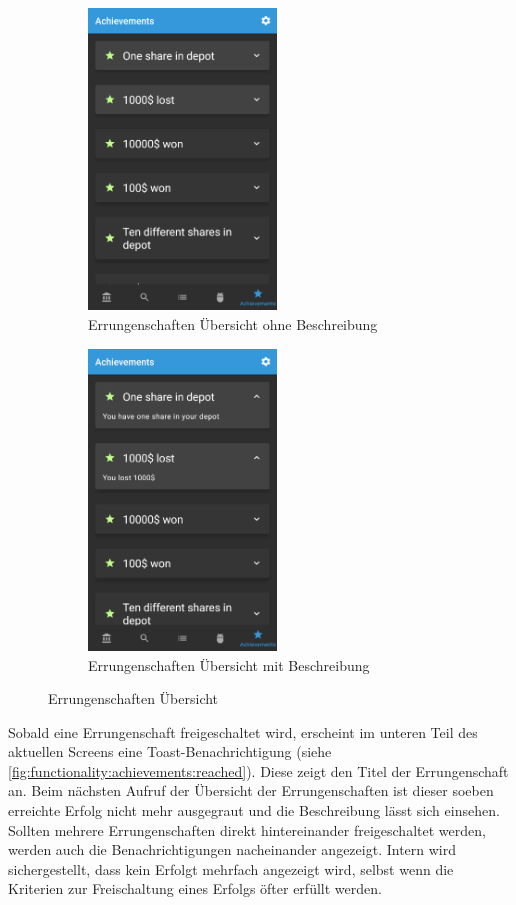 \documentclass[a4paper]{article}
\begin{document}
\begin{figure}[H]
    \begin{subfigure}{.5\textwidth}
        \centering
        \includegraphics[height=8cm,keepaspectratio]{./images/achievements_list.png}  
        \caption{Errungenschaften Übersicht ohne Beschreibung}
        \label{fig:functionality:achievements:overview:closed}
    \end{subfigure}
    \begin{subfigure}{.5\textwidth}
        \centering
        \includegraphics[height=8cm,keepaspectratio]{./images/achievements_list_open.png}  
        \caption{Errungenschaften Übersicht mit Beschreibung}
        \label{fig:functionality:achievements:overview:open}
    \end{subfigure}
    \caption{Errungenschaften Übersicht}
    \label{fig:functionality:achievements:overview}
\end{figure}

Sobald eine Errungenschaft freigeschaltet wird, erscheint im unteren Teil des aktuellen Screens eine Toast-Benachrichtigung \autocite{android_toasts} (siehe \autoref{fig:functionality:achievements:reached}). Diese zeigt den Titel der Errungenschaft an. Beim nächsten Aufruf der Übersicht der Errungenschaften ist dieser soeben erreichte Erfolg nicht mehr ausgegraut und die Beschreibung lässt sich einsehen. Sollten mehrere Errungenschaften direkt hintereinander freigeschaltet werden, werden auch die Benachrichtigungen nacheinander angezeigt. Intern wird sichergestellt, dass kein Erfolgt mehrfach angezeigt wird, selbst wenn die Kriterien zur Freischaltung eines Erfolgs öfter erfüllt werden.
\end{document}
